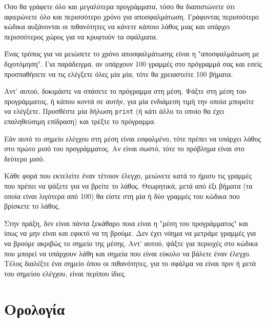 \documentclass[10pt]{book}
\begin{document}
Όσο θα γράφετε όλο και μεγαλύτερα προγράμματα, τόσο θα διαπιστώνετε ότι αφιερώνετε όλο και περισσότερο χρόνο για αποσφαλμάτωση. Γράφοντας περισσότερο κώδικα αυξάνονται οι πιθανότητες να κάνετε κάποιο λάθος μιας και υπάρχει περισσότερος χώρος για να κρυφτούν τα σφάλματα.

Ένας τρόπος για να μειώσετε το χρόνο αποσφαλμάτωσης είναι η "αποσφαλμάτωση με
διχοτόμηση". Για παράδειγμα, αν υπάρχουν 100 γραμμές στο πρόγραμμά σας και εσείς προσπαθήσετε να τις ελέγξετε όλες μία μία, τότε θα χρειαστείτε 100 βήματα.

Αντ' αυτού, δοκιμάστε να σπάσετε το πρόγραμμα στη μέση. Ψάξτε στη μέση του προγράμματος, ή κάπου κοντά σε αυτήν, για μία ενδιάμεση τιμή την οποία μπορείτε να ελέγξετε. Προσθέστε μία δήλωση {\tt print} (ή κάτι άλλο το οποίο θα έχει επαληθεύσιμη επίδραση) και τρέξτε το πρόγραμμα.

Εάν αυτό το σημείο ελέγχου στη μέση είναι εσφαλμένο, τότε πρέπει να υπάρχει λάθος στο πρώτο μισό του προγράμματος. Αν είναι σωστό, τότε το πρόβλημα είναι στο δεύτερο μισό.

Κάθε φορά που εκτελείτε έναν τέτοιον έλεγχο, μειώνετε κατά το ήμισυ τις γραμμές που πρέπει να ψάξετε για να βρείτε το λάθος. Θεωρητικά, μετά από έξι βήματα (τα οποία είναι λιγότερα από 100) θα είστε στη μία ή δύο γραμμές του κώδικα που βρίσκετε το λάθος.

Στην πράξη, δεν είναι πάντα ξεκάθαρο ποια είναι η "μέση του προγράμματος" και ίσως να μην είναι και εφικτό να τη βρούμε. Δεν έχει νόημα να μετράμε γραμμές για να βρούμε ακριβώς το σημείο της μέσης. Αντ' αυτού, ψάξτε για περιοχές στο κώδικα που μπορεί να υπάρχουν λάθη και σημεία που είναι εύκολο να βάλετε έναν έλεγχο. Τέλος διαλέξτε ένα σημείο όπου οι πιθανότητες, για
το σφάλμα να είναι πριν ή μετά του σημείου ελέγχου, είναι περίπου ίδιες.




\section{Ορολογία}
\end{document}
